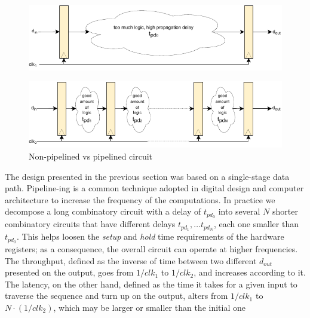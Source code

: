 \begin{figure}
    \centering
    \includegraphics[width=1\textwidth]{figures/pipeline_drawio1.pdf}
\end{figure}
\begin{figure}
    \includegraphics[width=1\textwidth]{figures/pipeline_drawio2.pdf}
    \caption{Non-pipelined vs pipelined circuit} 
    \label{fig:pipeline_vs_nonpipeline}
\end{figure}
The design presented in the previous section was based on a single-stage data path.
Pipeline-ing is a common technique adopted in digital design and computer architecture to increase the frequency of the computations. In practice we decompose a long combinatory circuit with a delay of $t_{pd_0}$ into several $N$ shorter combinatory circuits that have different delays $t_{pd_1}, \dots t_{pd_{N}}$, each one smaller than $t_{pd_0}$. This helps loosen the \textit{setup} and \textit{hold} time requirements of the hardware registers;  as a consequence, the overall circuit can operate at higher frequencies. The throughput, defined as the inverse of time between two different $d_{out}$ presented on the output, goes from $1/clk_1$ to $1/clk_2$, and increases according to it.
The latency, on the other hand, defined as the time it takes for a given input to traverse the sequence and turn up on the output, alters from $1/clk_1$ to $N \cdot (1/clk_2)$, which may be larger or smaller than the initial one

